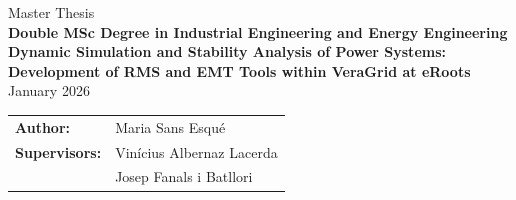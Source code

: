 \documentclass[a4paper, 11pt, titlepage, twoside]{article}
\begin{document}


\begin{titlepage}
    {\centering
    {\Huge Master Thesis}\\
    \vspace{5mm}
    {\Large \textbf{Double MSc Degree in Industrial Engineering and Energy Engineering}}\\
    \vspace{15mm}
    \Huge \textbf{Dynamic Simulation and Stability Analysis of Power Systems: Development of RMS and EMT Tools within VeraGrid at eRoots}\\
    \vspace{10mm}
    \Large{January 2026}\\  %
    }
    \vspace{15mm}
    \hspace{2mm}
    \begin{tabular}{l@{ } l}
        \vspace{5mm}
        \Large \textbf{Author:} & \hspace{3mm} \Large{Maria Sans Esqué} \\
        \vspace{5mm}
    \Large\textbf{Supervisors:} & \hspace{3mm} \Large{Vinícius Albernaz Lacerda} \\
                                & \hspace{3mm} \Large{Josep Fanals i Batllori} \\


\end{tabular}
\end{titlepage}
\end{document}
